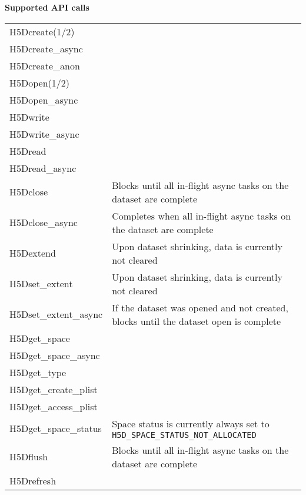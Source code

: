 \documentclass[../users_guide.tex]{subfiles}
\begin{document}
\begin{center}

\textbf{Supported API calls}
\vspace{.2in} \\

\begin{tabularx}{\linewidth}{| X | >{\RaggedRight}X |}
\hline
\rowcolor{lightgray!50}%
\multicolumn{1}{| c |}{\textbf{API call}} & \multicolumn{1}{c |}{\textbf{Notes}} \\ \hline

H5Dcreate(1/2) & \\ \hline
H5Dcreate\_async & \\ \hline
H5Dcreate\_anon & \\ \hline
H5Dopen(1/2) & \\ \hline
H5Dopen\_async & \\ \hline
H5Dwrite & \\ \hline
H5Dwrite\_async & \\ \hline
H5Dread & \\ \hline
H5Dread\_async & \\ \hline
H5Dclose & Blocks until all in-flight async tasks on the dataset are complete\\ \hline
H5Dclose\_async & Completes when all in-flight async tasks on the dataset are complete\\ \hline
H5Dextend & Upon dataset shrinking, data is currently not cleared\footnotemark[1]\\ \hline
H5Dset\_extent & Upon dataset shrinking, data is currently not cleared\footnotemark[1]\\ \hline
H5Dset\_extent\_async & If the dataset was opened and not created, blocks until the dataset open is complete\\ \hline
H5Dget\_space & \\ \hline
H5Dget\_space\_async & \\ \hline
H5Dget\_type & \\ \hline
H5Dget\_create\_plist & \\ \hline
H5Dget\_access\_plist & \\ \hline
H5Dget\_space\_status & Space status is currently always set to \texttt{H5D\_SPACE\_STATUS\_NOT\_ALLOCATED}\\ \hline
H5Dflush & Blocks until all in-flight async tasks on the dataset are complete\\ \hline
H5Drefresh & \\ \hline


\end{tabularx}
\end{center}
\end{document}
